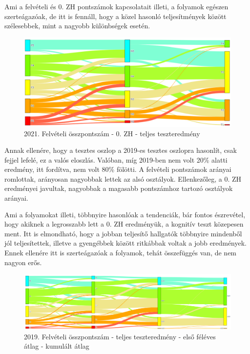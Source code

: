 \documentclass[12pt]{article}
\begin{document}
Ami a felvételi és 0. ZH pontszámok kapcsolatait illeti, a folyamok egészen szerteágazóak, de itt is fennáll, hogy a közel hasonló teljesítmények között szélesebbek, mint a nagyobb különbségek esetén.

\begin{figure}[H]
\centering
\includegraphics[width = \textwidth]{kepek/2021_old_felvi_0zh_teszt.png}
\caption{2021. Felvételi összpontszám - 0. ZH - teljes teszteredmény}
\label{fig:2021_old_felvi_0zh_teszt}
\end{figure}

Annak ellenére, hogy a tesztes oszlop a 2019-es tesztes oszlopra hasonlít, csak fejjel lefelé, ez a valós eloszlás. Valóban, míg 2019-ben nem volt 20\% alatti eredmény, itt fordítva, nem volt 80\% fölötti. A felvételi pontszámok arányai romlottak, arányosan nagyobbak lettek az alsó osztályok. Ellenkezőleg, a 0. ZH eredményei javultak, nagyobbak a magasabb pontszámhoz tartozó osztályok arányai. 

Ami a folyamokat illeti, többnyire hasonlóak a tendenciák, bár fontos észrevétel, hogy akiknek a legrosszabb lett a 0. ZH eredményük, a kognitív teszt közepesen ment. Itt is elmondható, hogy a jobban teljesítő hallgatók többnyire mindenből jól teljesítettek, illetve a gyengébbek között ritkábbak voltak a jobb eredmények. Ennek ellenére itt is szerteágazóak a folyamok, tehát összefüggés van, de nem nagyon erős.


\begin{figure}[H]
\centering
\includegraphics[width = \textwidth]{kepek/2019_felvi_teszt_atlag_kumatlag.png}
\caption{2019. Felvételi összpontszám - teljes teszteredmény - első féléves átlag - kumulált átlag}
\label{fig:2019_felvi_teszt_atlag_kumatlag}
\end{figure}
\end{document}
